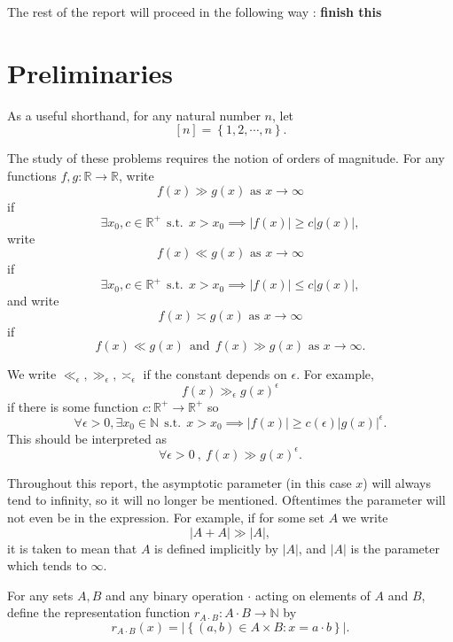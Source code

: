 \documentclass[12pt]{amsart}
\begin{document}
The rest of the report will proceed in the following way : \textbf{finish this}

\section{Preliminaries}

As a useful shorthand, for any natural number \(n\), let
\[
    [n] = \left\{ 1, 2 , \cdots , n \right\} 
.\]

The study of these problems requires the notion of orders of magnitude.
For any functions \(f,g: \mathbb{R}   \to \mathbb{R} \), write
\[
    f(x) \gg g(x) \text{ as } x \to \infty 
\]
if
\[
    \exists x_0,c \in \mathbb{R} ^{+}~~\text{s.t.}~~ x > x_0 \implies \left\lvert f(x) \right\rvert \geq c \left\lvert g(x) \right\rvert  
,\]
write
\[
    f(x) \ll g(x) \text{ as } x \to \infty 
\]
if
\[
     \exists x_0,c \in \mathbb{R} ^{+}~~\text{s.t.}~~ x > x_0 \implies \left\lvert f(x) \right\rvert \leq c \left\lvert g(x) \right\rvert 
,\]
and write
\[
    f(x) \asymp g(x) \text{ as } x \to \infty 
\]
if
\[
    f(x) \ll g(x)  ~ ~ \text{and} ~ ~ f(x) \gg g(x) \text{ as } x \to \infty 
.\]

We write \(\ll _{\epsilon},\gg _{\epsilon}, \asymp _{\epsilon} \) if the constant depends on \(\epsilon\). For example,
\[
    f(x) \gg _{\epsilon} g(x) ^{ \epsilon}
\]
if there is some function \(c : \mathbb{R} ^{+ }\to \mathbb{R} ^{+}\) so
\[
    \forall \epsilon > 0, \exists x_0\in \mathbb{N} ~~\text{s.t.}~~ x > x_0 \implies \left\lvert f(x) \right\rvert \geq c (\epsilon)\left\lvert g(x) \right\rvert ^{\epsilon}
.\]
This should be interpreted as
\[
   \forall \epsilon> 0~,~ f(x) \gg g(x) ^{\epsilon}
.\]

Throughout this report, the asymptotic parameter (in this case \(x\)) will always tend to infinity,
so it will no longer be mentioned.
Oftentimes the parameter will not even be in the expression. For example,
if for some set \(A\) we write
\[
    \left\lvert A + A \right\rvert \gg \left\lvert A \right\rvert 
,\]
it is taken to mean that \(A\) is defined implicitly by \(\left\lvert A \right\rvert \), and
\(\left\lvert A \right\rvert \) is the parameter which tends to \(\infty \).

For any sets \(A,B\) and any binary operation \(\cdot \) acting on elements of \(A\) and \(B\), define the representation function
\(r_{A \cdot B} : A \cdot B \to \mathbb{N} \) by
\[
    r_{A \cdot B} (x) = \left\lvert \left\{ (a,b)\in  A \times B : x = a \cdot b \right\}  \right\rvert
.\]
\end{document}
